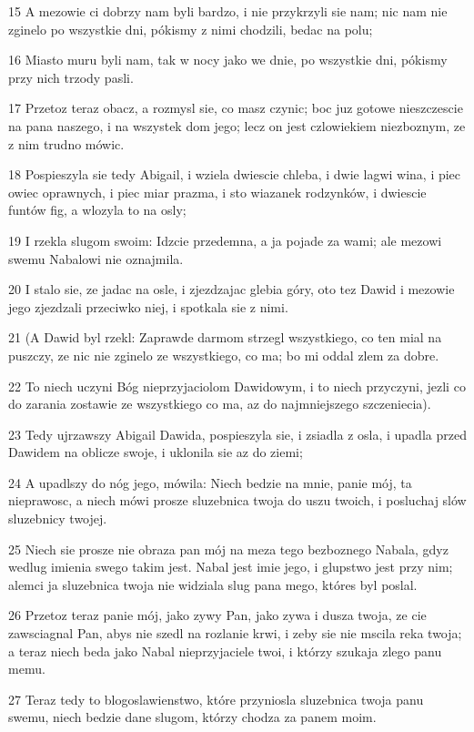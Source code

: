 \par 15 A mezowie ci dobrzy nam byli bardzo, i nie przykrzyli sie nam; nic nam nie zginelo po wszystkie dni, pókismy z nimi chodzili, bedac na polu;
\par 16 Miasto muru byli nam, tak w nocy jako we dnie, po wszystkie dni, pókismy przy nich trzody pasli.
\par 17 Przetoz teraz obacz, a rozmysl sie, co masz czynic; boc juz gotowe nieszczescie na pana naszego, i na wszystek dom jego; lecz on jest czlowiekiem niezboznym, ze z nim trudno mówic.
\par 18 Pospieszyla sie tedy Abigail, i wziela dwiescie chleba, i dwie lagwi wina, i piec owiec oprawnych, i piec miar prazma, i sto wiazanek rodzynków, i dwiescie funtów fig, a wlozyla to na osly;
\par 19 I rzekla slugom swoim: Idzcie przedemna, a ja pojade za wami; ale mezowi swemu Nabalowi nie oznajmila.
\par 20 I stalo sie, ze jadac na osle, i zjezdzajac glebia góry, oto tez Dawid i mezowie jego zjezdzali przeciwko niej, i spotkala sie z nimi.
\par 21 (A Dawid byl rzekl: Zaprawde darmom strzegl wszystkiego, co ten mial na puszczy, ze nic nie zginelo ze wszystkiego, co ma; bo mi oddal zlem za dobre.
\par 22 To niech uczyni Bóg nieprzyjaciolom Dawidowym, i to niech przyczyni, jezli co do zarania zostawie ze wszystkiego co ma, az do najmniejszego szczeniecia).
\par 23 Tedy ujrzawszy Abigail Dawida, pospieszyla sie, i zsiadla z osla, i upadla przed Dawidem na oblicze swoje, i uklonila sie az do ziemi;
\par 24 A upadlszy do nóg jego, mówila: Niech bedzie na mnie, panie mój, ta nieprawosc, a niech mówi prosze sluzebnica twoja do uszu twoich, i posluchaj slów sluzebnicy twojej.
\par 25 Niech sie prosze nie obraza pan mój na meza tego bezboznego Nabala, gdyz wedlug imienia swego takim jest. Nabal jest imie jego, i glupstwo jest przy nim; alemci ja sluzebnica twoja nie widziala slug pana mego, któres byl poslal.
\par 26 Przetoz teraz panie mój, jako zywy Pan, jako zywa i dusza twoja, ze cie zawsciagnal Pan, abys nie szedl na rozlanie krwi, i zeby sie nie mscila reka twoja; a teraz niech beda jako Nabal nieprzyjaciele twoi, i którzy szukaja zlego panu memu.
\par 27 Teraz tedy to blogoslawienstwo, które przyniosla sluzebnica twoja panu swemu, niech bedzie dane slugom, którzy chodza za panem moim.
